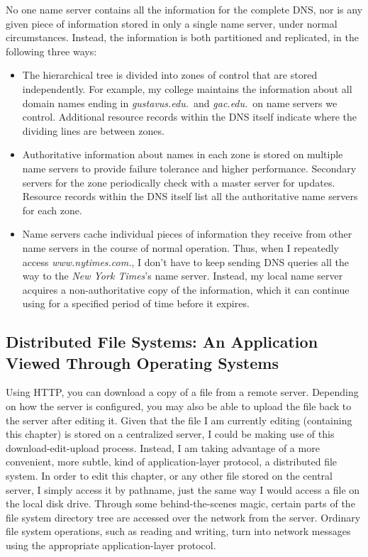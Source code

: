 No one name server contains all the information for the complete DNS,
nor is any given piece of information stored in only a single
name server, under normal circumstances.  Instead, the information is both partitioned and
replicated, in the following three ways:
\begin{itemize}
\item
The hierarchical tree is divided into zones of control that are stored
independently.  For example, my college maintains the information
about all domain names ending in \textit{gustavus.edu.}\ and
\textit{gac.edu.}\ on name servers we control.  Additional resource
records within the DNS itself indicate where the dividing lines are
between zones.
\item
Authoritative information about names in each zone is stored on multiple
name servers to provide failure tolerance and higher performance.
Secondary servers for the zone periodically check with a master server
for updates.  Resource records within the DNS itself list all the
authoritative name servers for each zone.
\item
Name servers cache individual pieces of information they receive from
other name servers in the course of normal operation.  Thus, when I
repeatedly access \textit{www.nytimes.com.}, I don't have to keep
sending DNS queries all the way to the \textit{New York Times}'s name
server.  Instead, my local name server acquires a non-authoritative copy
of the information, which it can continue using for a specified period
of time before it expires.
\end{itemize}

\subsection{Distributed File Systems: An Application Viewed Through
  Operating Systems}\label{dfs-section}

Using HTTP, you can download a copy of a file from a remote server.
Depending on how the server is configured, you may also be able to
upload the file back to the server after editing it.  Given that the
file I am currently editing (containing this chapter) is stored on a
centralized server, I could be making use of this download-edit-upload
process.  Instead, I am taking advantage of a more convenient,
more subtle, kind of application-layer protocol, a distributed file
system.  In order to edit this chapter, or any other file stored on
the central server, I simply access it by pathname, just the same way
I would access a file on the local disk drive.  Through some
behind-the-scenes magic, certain parts of the file system directory
tree are accessed over the network from the server.  Ordinary
file system operations, such as reading and writing, turn into network
messages using the appropriate application-layer protocol.

